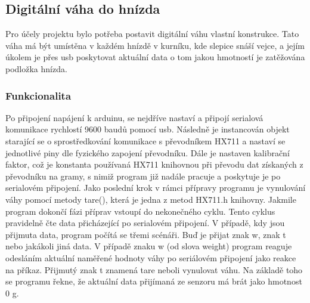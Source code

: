 

\subsection{Digitální váha do hnízda}\label{subsec:digitalni-vaha-do-hnizda}
Pro účely projektu bylo potřeba postavit digitální váhu vlastní konstrukce.
Tato váha má být umístěna v každém hnízdě v kurníku, kde slepice snáší vejce, a jejím úkolem je přes usb poskytovat aktuální data o tom jakou hmotností je zatěžována podložka hnízda.

\subsubsection{Funkcionalita}
Po připojení napájení k arduinu, se nejdříve nastaví a připojí serialová komunikace rychlostí 9600 baudů pomocí usb.
Následně je instancován objekt starající se o sprostředkování komunikace s převodníkem HX711 a nastaví se jednotlivé piny dle fyzického zapojení převodníku.
Dále je nastaven kalibrační faktor, což je konstanta používaná HX711 knihovnou při převodu dat získaných z převodníku na gramy, s nimiž program již nadále pracuje a poskytuje je po serialovém připojení.
Jako poslední krok v rámci přípravy programu je vynulování váhy pomocí metody tare(), která je jedna z metod HX711.h knihovny.
Jakmile program dokončí fázi příprav vstoupí do nekonečného cyklu.
Tento cyklus pravidelně čte data přicházející po serialovém připojení.
V případě, kdy jsou přijmuta data, program počítá se třemi scénáři.
Buď je přijat znak w, znak t nebo jakákoli jiná data.
V případě znaku w (od slova weight) program reaguje odesláním aktuální naměřené hodnoty váhy po seriálovém připojení jako reakce na příkaz.
Přijmutý znak t znamená tare neboli vynulovat váhu.
Na základě toho se programu řekne, že aktuální data přijímaná ze senzoru má brát jako hmotnost 0 g.


